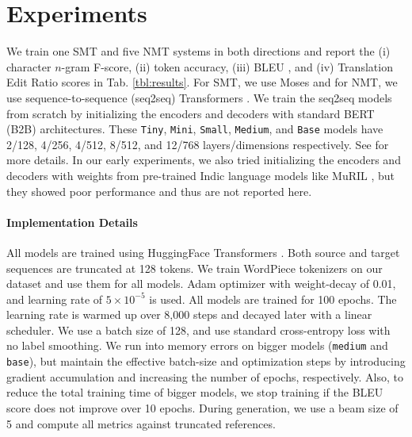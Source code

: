 \documentclass[11pt,a4paper]{article}
\begin{document}
\section{Experiments}\label{sec:expts}
We train one SMT and five NMT systems in both directions and report the (i) character $n$-gram F-score, (ii) token accuracy, (iii) BLEU \cite{bleu}, and (iv) Translation Edit Ratio \cite[TER]{ter} scores in Tab. \ref{tbl:results}. For SMT, we use Moses \cite{moses} and for NMT, we use sequence-to-sequence (seq2seq) Transformers \cite{transformer}. We train the seq2seq models from scratch by initializing the encoders and decoders with standard BERT (B2B) architectures. These {\tt Tiny}, {\tt Mini}, {\tt Small}, {\tt Medium}, and {\tt Base} models have 2/128, 4/256, 4/512, 8/512, and 12/768 layers/dimensions respectively. See  for more details. In our early experiments, we also tried initializing the encoders and decoders with weights from pre-trained Indic language models like MuRIL \cite{muril}, but they showed poor performance and thus are not reported here.

\paragraph{Implementation Details}
All models are trained using HuggingFace Transformers \cite{hf}. Both source and target sequences are truncated at 128 tokens. We train WordPiece tokenizers on our dataset and use them for all models. Adam optimizer \cite{adam} with weight-decay of 0.01, and learning rate of $5\times10^{-5}$ is used. All models are trained for 100 epochs. The learning rate is warmed up over 8,000 steps and decayed later with a linear scheduler. We use a batch size of 128, and use standard cross-entropy loss with no label smoothing. We run into memory errors on bigger models ({\tt medium} and {\tt base}), but maintain the effective batch-size and optimization steps by introducing gradient accumulation and increasing the number of epochs, respectively. Also, to reduce the total training time of bigger models, we stop training if the BLEU score does not improve over 10 epochs. During generation, we use a beam size of 5 and compute all metrics against truncated references.
\end{document}
